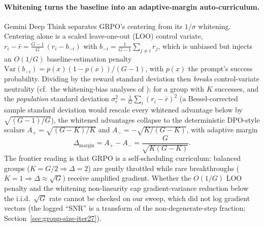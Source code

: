 \paragraph{Whitening turns the baseline into an adaptive-margin auto-curriculum.}
Gemini Deep Think separates GRPO's centering from its $1/\sigma$
whitening. Centering alone is a scaled leave-one-out (LOO) control
variate, $r_i - \bar r = \tfrac{G-1}{G}\,(r_i - b_{-i})$ with
$b_{-i}=\tfrac{1}{G-1}\sum_{j\ne i} r_j$, which is unbiased but injects
an $O(1/G)$ baseline-estimation penalty
$\mathrm{Var}(b_{-i}) = p(x)(1-p(x))/(G-1)$, with $p(x)$ the
prompt's success probability. Dividing by the reward
standard deviation then \emph{breaks} control-variate neutrality
(cf.\ the whitening-bias analyses of \citep{tong2025drgrpo,vojnovic2025grpo}):
for a group with $K$ successes, and the \emph{population} standard
deviation $\sigma_r^2=\tfrac1G\sum_i(r_i-\bar r)^2$ (a
Bessel-corrected sample standard deviation would rescale every
whitened advantage below by $\sqrt{(G-1)/G}$), the whitened
advantages collapse to the deterministic DPO-style scalars
$A_+ = \sqrt{(G-K)/K}$ and $A_- = -\sqrt{K/(G-K)}$, with adaptive
margin
\begin{equation}
  \Delta_\text{margin} = A_+ - A_- = \frac{G}{\sqrt{K(G-K)}}.
  \label{eq:fs-margin}
\end{equation}
The frontier reading is that GRPO is a self-scheduling curriculum:
balanced groups ($K{=}G/2 \Rightarrow \Delta{=}2$) are gently throttled
while rare breakthroughs ($K{=}1 \Rightarrow \Delta \approx \sqrt{G}$)
receive amplified gradient. Whether the $O(1/G)$ LOO penalty and the whitening
non-linearity cap gradient-variance reduction below the i.i.d.\ $\sqrt{G}$ rate
cannot be checked on our sweep, which did not log gradient vectors (the logged
``SNR'' is a transform of the non-degenerate-step fraction;
Section~\ref{sec:group-size-iter27}).

